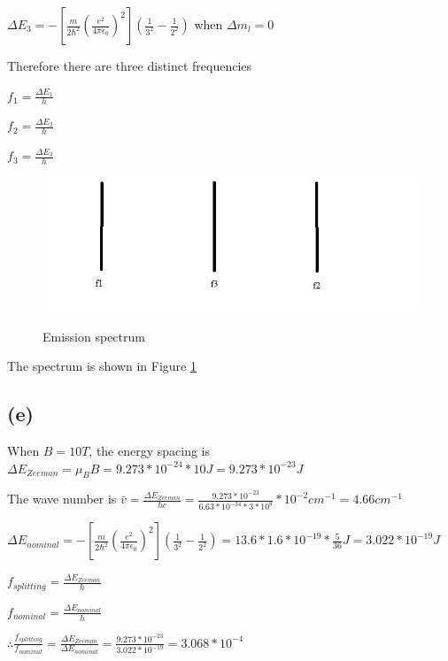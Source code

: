 \documentclass[12pt]{article}
\begin{document}
\begin{spacing}{2.0}
$\Delta E_3 = -\left[ \frac{m}{2\hbar^2} \left( \frac{e^2}{4\pi\epsilon_0} \right)^2 \right] \left(\frac{1}{3^2}-\frac{1}{2^2}\right)$ when $\Delta m_l=0$

Therefore there are three distinct frequencies

$f_1=\frac{\Delta E_1}{h}$

$f_2=\frac{\Delta E_2}{h}$

$f_3=\frac{\Delta E_3}{h}$

\begin{figure}
  \centering
  \includegraphics[width=6in]{out3}\\
  \caption{Emission spectrum}\label{out3}
\end{figure}

The spectrum is shown in Figure \ref{out3}

\subsection*{(e)}

When $B=10 T$, the energy spacing is $\Delta E_{Zeeman}= \mu_B B = 9.273*10^{-24}*10 J = 9.273*10^{-23} J$

The wave number is $\bar{v}= \frac{\Delta E_{Zeeman}}{hc}= \frac{9.273*10^{-23}}{6.63*10^{-34}* 3*10^8} *10^{-2} cm^{-1}= 4.66 cm^{-1}$

$\Delta E_{nominal} = -\left[ \frac{m}{2\hbar^2} \left( \frac{e^2}{4\pi\epsilon_0} \right)^2 \right] \left(\frac{1}{3^2}-\frac{1}{2^2}\right)= 13.6*1.6*10^{-19}*\frac{5}{36} J = 3.022*10^{-19} J$

$f_{splitting}=\frac{\Delta E_{Zeeman}}{h}$

$f_{nominal}= \frac{\Delta E_{nominal}}{h}$

$\therefore \frac{f_{splitting}}{f_{nominal}} = \frac{\Delta E_{Zeeman}}{\Delta E_{nominal}} = \frac{9.273*10^{-23}}{3.022*10^{-19}}= 3.068*10^{-4}$

\section{} %


\end{spacing}
\end{document}
